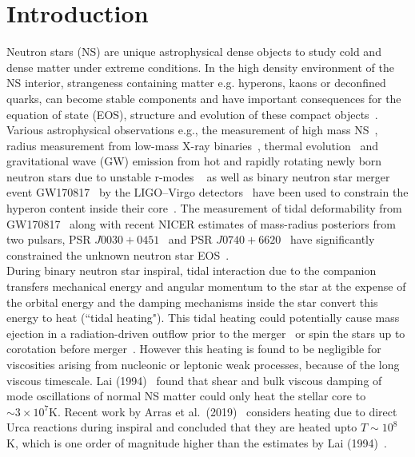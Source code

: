 \documentclass[%
 reprint,
 amsmath,amssymb,
 aps,
]{revtex4-2}
\begin{document}
\maketitle


\section{\label{sec:intro} Introduction}
Neutron stars (NS) are unique astrophysical dense objects to study  cold  and  dense  matter  under  extreme  conditions. In the high density environment of the NS interior, strangeness containing   matter e.g. hyperons, kaons or deconfined quarks, can become stable components and have important consequences for the equation of state (EOS), structure and evolution of these compact objects~\cite{GlendenningBook,Lattimer2004,Blaschke2018,Tolos_2020,Annala_2023}. %
Various astrophysical observations e.g., the measurement of high mass NS~\cite{Weissenborn2011,Weissenborn_2012}, radius measurement from low-mass X-ray binaries~\cite{Constanca2013,Fortin2015}, thermal evolution~\cite{Anzuini_2021} and gravitational wave (GW) emission from  hot and rapidly rotating newly born neutron stars due to unstable r-modes ~\cite{Lindblom2002,Debi_2006,Jha2022} as well as binary neutron star merger event GW170817~\cite{Abbott2017,Abbott2018,Abbott2019} by the LIGO–Virgo detectors~\citep{AdvLIGO2015,Abbott2016,AdvVIRGO2014} have been used to constrain the hyperon content inside their core~\cite{Chatterjee_2016,Gomes_2019,blacker2023thermal}. The measurement of tidal deformability from  GW170817~\cite{Abbott2017} along with  recent NICER estimates of mass-radius posteriors from two pulsars, PSR $J0030+0451$~\cite{NICER0030_Miller,NICER0030_Riley} and PSR $J0740+6620$~\cite{NICER0740_Miller,NICER0740_Riley} have significantly constrained the unknown neutron star EOS~\cite{Annala,De,Most,Dietrich2020,Pang_2021,Issac2021}.  \\

During binary neutron star inspiral, tidal interaction due to the companion transfers mechanical energy and angular momentum to the star at the expense of the orbital energy and the damping mechanisms inside the star convert this energy to heat (``tidal heating"). This tidal heating could potentially cause mass ejection in a radiation-driven outflow prior to the merger~\cite{Rees1992} or spin the stars up to corotation before merger~\cite{Kochanek1992,Bildsten1992}. However this heating is found to be negligible for viscosities arising from  nucleonic or leptonic weak processes, because of the long viscous timescale. Lai (1994)~\cite{Lai_1994} found that shear and bulk viscous damping of mode oscillations of normal NS matter could only heat the stellar core to $\sim 3\times 10^7$K. Recent work by Arras et al.~(2019)~\cite{Arras2019} considers heating due to direct Urca reactions during inspiral and concluded that they are heated upto $T \sim 10^8$K, which is one order of magnitude higher than  the estimates by Lai (1994)~\cite{Lai_1994}. \\
\end{document}
